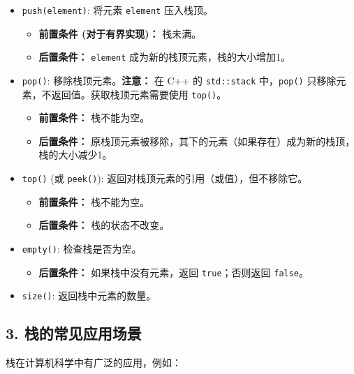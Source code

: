 \begin{itemize}
	\item \lstinline{push(element)}: 将元素 \lstinline{element} 压入栈顶。
	\begin{itemize}
		\item \textbf{前置条件 (对于有界实现)：} 栈未满。
		\item \textbf{后置条件：} \lstinline{element} 成为新的栈顶元素，栈的大小增加1。
	\end{itemize}
	\item \lstinline{pop()}: 移除栈顶元素。\textbf{注意：} 在 C++ 的 \lstinline{std::stack} 中，\lstinline{pop()} 只移除元素，不返回值。获取栈顶元素需要使用 \lstinline{top()}。
	\begin{itemize}
		\item \textbf{前置条件：} 栈不能为空。
		\item \textbf{后置条件：} 原栈顶元素被移除，其下的元素（如果存在）成为新的栈顶，栈的大小减少1。
	\end{itemize}
	\item \lstinline{top()} (或 \lstinline{peek()}): 返回对栈顶元素的引用（或值），但不移除它。
	\begin{itemize}
		\item \textbf{前置条件：} 栈不能为空。
		\item \textbf{后置条件：} 栈的状态不改变。
	\end{itemize}
	\item \lstinline{empty()}: 检查栈是否为空。
	\begin{itemize}
		\item \textbf{后置条件：} 如果栈中没有元素，返回 \lstinline{true}；否则返回 \lstinline{false}。
	\end{itemize}
	\item \lstinline{size()}: 返回栈中元素的数量。
\end{itemize}

\subsection{3. 栈的常见应用场景}

栈在计算机科学中有广泛的应用，例如：

